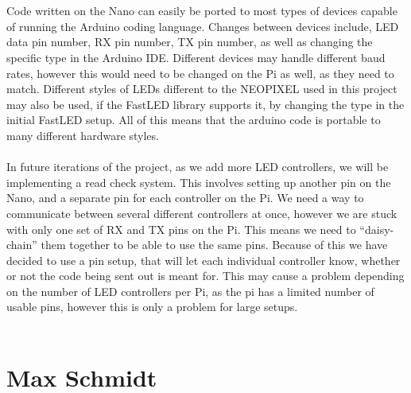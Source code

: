 \documentclass[onecolumn, draftclsnofoot,10pt, compsoc]{IEEEtran}
\begin{document}
	\\\\
	\noindent Code written on the Nano can easily be ported to most types of devices capable
	of running the Arduino coding language. Changes between devices include, LED
	data pin number, RX pin number, TX pin number, as well as changing the
	specific type in the Arduino IDE. Different devices may handle different baud
	rates, however this would need to be changed on the Pi as well, as they need to
	match. Different styles of LEDs different to the NEOPIXEL used in this project
	may also be used, if the FastLED library supports it, by changing the type in
	the initial FastLED setup. All of this means that the arduino code is portable
	to many different hardware styles.
	\\\\
	\noindent In future iterations of the project, as we add more LED controllers, we will
	be implementing a read check system. This involves setting up another pin on
	the Nano, and a separate pin for each controller on the Pi. We need a way to
	communicate between several different controllers at once, however we are
	stuck with only one set of RX and TX pins on the Pi. This means we need to
	“daisy-chain” them together to be able to use the same pins. Because of this
	we have decided to use a pin setup, that will let each individual controller
	know, whether or not the code being sent out is meant for. This may cause a
	problem depending on the number of LED controllers per Pi, as the pi has a
	limited number of usable pins, however this is only a problem for large setups.
	\\\\
	\section{Max Schmidt}
\end{document}
